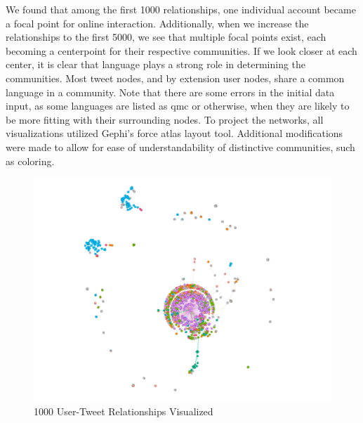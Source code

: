 \documentclass{article}
\begin{document}
We found that among the first 1000 relationships, one individual account became a focal point for online interaction. Additionally, when we increase the relationships to the first 5000, we see that multiple focal points exist, each becoming a centerpoint for their respective communities. 
If we look closer at each center, it is clear that language plays a strong role in determining the communities. Most tweet nodes, and by extension user nodes, share a common language in a community. Note that there are some errors in the initial data input, as some languages are listed as qmc or otherwise, when they are likely to be more fitting with their surrounding nodes. To project the networks, all visualizations utilized Gephi's force atlas layout tool. Additional modifications were made to allow for ease of understandability of distinctive communities, such as coloring. 
\begin{figure}[h!]
    \centering
    \includegraphics[width=0.8\linewidth]{Graph Analytics/graph_1k.png}
    \caption{1000 User-Tweet Relationships Visualized}
    \label{fig:enter-label}
\end{figure} 
\end{document}
